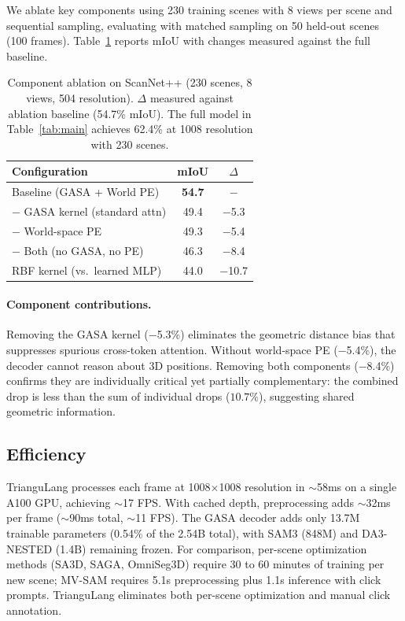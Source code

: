 We ablate key components using 230 training scenes with 8 views per scene and sequential sampling, evaluating with matched sampling on 50 held-out scenes (100 frames). Table~\ref{tab:ablation} reports mIoU with changes measured against the full baseline.

\begin{table}[t]
\centering
\caption{Component ablation on ScanNet++ (230 scenes, 8 views, 504 resolution). $\Delta$ measured against ablation baseline (54.7\% mIoU). The full model in Table~\ref{tab:main} achieves 62.4\% at 1008 resolution with 230 scenes.}
\label{tab:ablation}
\small
\begin{tabular}{@{}lcc@{}}
\toprule
\textbf{Configuration} & \textbf{mIoU} & \textbf{$\Delta$} \\
\midrule
Baseline (GASA + World PE) & \textbf{54.7} & $-$ \\
\quad $-$ GASA kernel (standard attn) & 49.4 & $-$5.3 \\
\quad $-$ World-space PE & 49.3 & $-$5.4 \\
\quad $-$ Both (no GASA, no PE) & 46.3 & $-$8.4 \\
\quad RBF kernel (vs.\ learned MLP) & 44.0 & $-$10.7 \\
\bottomrule
\end{tabular}
\vspace{-2mm}
\end{table}

\paragraph{Component contributions.}
Removing the GASA kernel ($-$5.3\%) eliminates the geometric distance bias that suppresses spurious cross-token attention. Without world-space PE ($-$5.4\%), the decoder cannot reason about 3D positions. Removing both components ($-$8.4\%) confirms they are individually critical yet partially complementary: the combined drop is less than the sum of individual drops ($10.7\%$), suggesting shared geometric information.

\subsection{Efficiency}
TrianguLang processes each frame at 1008$\times$1008 resolution in $\sim$58ms on a single A100 GPU, achieving $\sim$17 FPS. With cached depth, preprocessing adds $\sim$32ms per frame ($\sim$90ms total, $\sim$11 FPS). The GASA decoder adds only 13.7M trainable parameters (0.54\% of the 2.54B total), with SAM3 (848M) and DA3-NESTED (1.4B) remaining frozen. For comparison, per-scene optimization methods (SA3D, SAGA, OmniSeg3D) require 30 to 60 minutes of training per new scene; MV-SAM requires 5.1s preprocessing plus 1.1s inference with click prompts. TrianguLang eliminates both per-scene optimization and manual click annotation.



